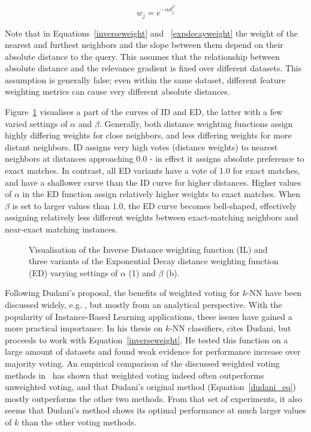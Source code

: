\documentclass{report}
\begin{document}
\begin{equation}
\label{expdecayweight}
w_{j}= e^{-\alpha d_{j}^\beta}
\end{equation}

Note that in Equations~\ref{inverseweight} and ~\ref{expdecayweight}
the weight of the nearest and furthest neighbors and the slope between
them depend on their absolute distance to the query. This assumes that
the relationship between absolute distance and the relevance gradient
is fixed over different datasets. This assumption is generally false;
even within the same dataset, different feature weighting metrics can
cause very different absolute distances. 

Figure~\ref{dist-weight-fig} visualises a part of the curves of ID and
ED, the latter with a few varied settings of $\alpha$ and
$\beta$. Generally, both distance weighting functions assign highly
differing weights for close neighbors, and less differing weights for
more distant neighbors. ID assigns very high votes (distance weights)
to nearest neighbors at distances approaching 0.0 - in effect it
assigns absolute preference to exact matches. In contrast, all ED
variants have a vote of 1.0 for exact matches, and have a shallower
curve than the ID curve for higher distances. Higher values of
$\alpha$ in the ED function assign relatively higher weights to exact
matches. When $\beta$ is set to larger values than $1.0$, the ED curve
becomes bell-shaped, effectively assigning relatively less different
weights between exact-matching neighbors and near-exact matching
instances.

\begin{figure}[htb]
        \begin{center}
                \leavevmode
                \columnwidth
                \caption{Visualisation of the Inverse Distance weighting function (IL) and three variants of the Exponential Decay distance weighting function (ED) varying settings of $\alpha$ (1) and $\beta$ (b).
                }
                \label{dist-weight-fig}
        \end{center}
\end{figure}

Following Dudani's proposal, the benefits of weighted voting for
$k$-NN have been discussed widely,
e.g. \cite{Bailey+78,Morin+81,MacLeod+87}, but mostly from an
analytical perspective. With the popularity of Instance-Based Learning
applications, these issues have gained a more practical importance. In
his thesis on $k$-NN classifiers,  cites
Dudani, but proceeds to work with Equation~\ref{inverseweight}. He
tested this function on a large amount of datasets and found weak
evidence for performance increase over majority voting. An empirical
comparison of the discussed weighted voting methods in~\cite{Zavrel97}
has shown that weighted voting indeed often outperforms unweighted
voting, and that Dudani's original method (Equation~\ref{dudani_eq})
mostly outperforms the other two methods. From that set of
experiments, it also seems that Dudani's method shows its optimal
performance at much larger values of $k$ than the other voting
methods.
\end{document}
